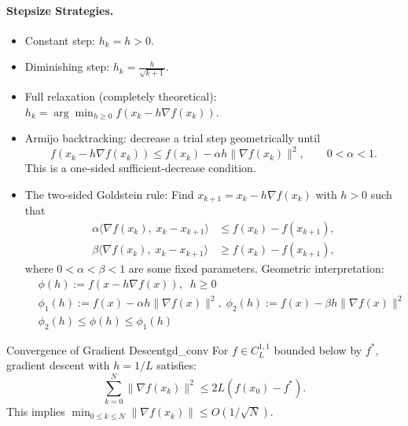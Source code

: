 \documentclass[11pt]{article}
\begin{document}
\paragraph{Stepsize Strategies.}
\begin{itemize}
    \item Constant step: $h_k=h>0$.
    \item Diminishing step: $h_k=\frac{h}{\sqrt{k+1}}$.
    \item Full relaxation (completely theoretical): $h_k=\arg\min_{h\geq0} f(x_k-h\nabla f(x_k))$.
    \item Armijo backtracking: decrease a trial step geometrically until
    \[
    f(x_k-h\nabla f(x_k))\le f(x_k)-\alpha h\|\nabla f(x_k)\|^2,
    \qquad 0<\alpha<1.
    \]
    This is a one-sided sufficient-decrease condition.
    \item The two-sided Goldstein rule: Find $x_{k+1}=x_k-h\nabla f(x_k)$ with $h>0$ such that
    \begin{align*}
        \alpha\langle\nabla f(x_k),\;x_k-x_{k+1}\rangle&\leq f(x_k)-f(x_{k+1}),\\
        \beta\langle\nabla f(x_k),\;x_k-x_{k+1}\rangle&\geq f(x_k)-f(x_{k+1}),
    \end{align*}
    where $0<\alpha<\beta<1$ are some fixed parameters. Geometric interpretation:  
    \begin{align*}
        &\phi(h):=f(x-h\nabla f(x)),\;\;h\geq 0\\
        &\phi_1(h):=f(x)-\alpha h\|\nabla f(x)\|^2,\; \phi_2(h):=f(x)-\beta h\|\nabla f(x)\|^2\\
        &\phi_2(h)\leq \phi(h)\leq\phi_1(h)
    \end{align*}
\end{itemize}
\begin{theorem}{Convergence of Gradient Descent}{gd_conv}
    For $f \in C_L^{1,1}$ bounded below by $f^*$, gradient descent with $h=1/L$ satisfies:
    \[ \sum_{k=0}^N \|\nabla f(x_k)\|^2 \le 2L(f(x_0) - f^*). \]
    This implies $\min_{0\le k \le N} \|\nabla f(x_k)\| \le O(1/\sqrt{N})$.
\end{theorem}
\end{document}
